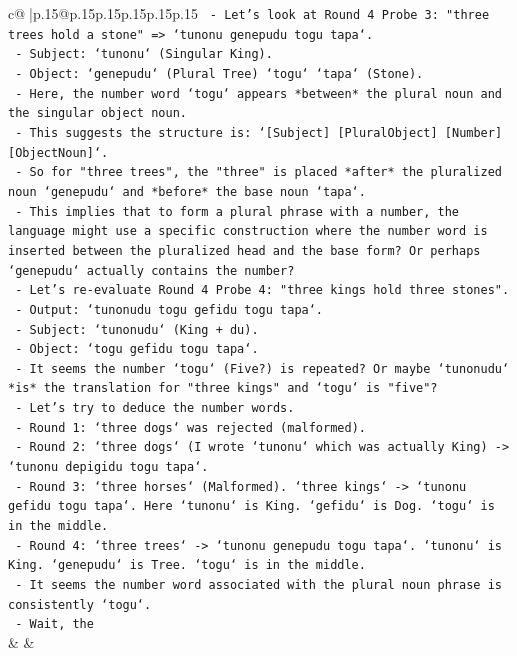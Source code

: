 \documentclass{article}
\begin{document}
{\begin{supertabular}{c@{$\;$}|p{.15\linewidth}@{}p{.15\linewidth}p{.15\linewidth}p{.15\linewidth}p{.15\linewidth}p{.15\linewidth}}
{{{\texttt{  {-} Let's look at Round 4 Probe 3: "three trees hold a stone" => `tunonu genepudu togu tapa`.} \\
\texttt{    {-} Subject: `tunonu` (Singular King).} \\
\texttt{    {-} Object: `genepudu` (Plural Tree) `togu` `tapa` (Stone).} \\
\texttt{    {-} Here, the number word `togu` appears *between* the plural noun and the singular object noun.} \\
\texttt{    {-} This suggests the structure is: `{[}Subject{]} {[}PluralObject{]} {[}Number{]} {[}ObjectNoun{]}`.} \\
\texttt{    {-} So for "three trees", the "three" is placed *after* the pluralized noun `genepudu` and *before* the base noun `tapa`.} \\
\texttt{    {-} This implies that to form a plural phrase with a number, the language might use a specific construction where the number word is inserted between the pluralized head and the base form? Or perhaps `genepudu` actually contains the number?} \\
\texttt{    {-} Let's re{-}evaluate Round 4 Probe 4: "three kings hold three stones".} \\
\texttt{      {-} Output: `tunonudu togu gefidu togu tapa`.} \\
\texttt{      {-} Subject: `tunonudu` (King + du).} \\
\texttt{      {-} Object: `togu gefidu togu tapa`.} \\
\texttt{      {-} It seems the number `togu` (Five?) is repeated? Or maybe `tunonudu` *is* the translation for "three kings" and `togu` is "five"?} \\
\texttt{      {-} Let's try to deduce the number words.} \\
\texttt{      {-} Round 1: `three dogs` was rejected (malformed).} \\
\texttt{      {-} Round 2: `three dogs` (I wrote `tunonu` which was actually King) {-}> `tunonu depigidu togu tapa`.} \\
\texttt{      {-} Round 3: `three horses` (Malformed). `three kings` {-}> `tunonu gefidu togu tapa`. Here `tunonu` is King. `gefidu` is Dog. `togu` is in the middle.} \\
\texttt{      {-} Round 4: `three trees` {-}> `tunonu genepudu togu tapa`. `tunonu` is King. `genepudu` is Tree. `togu` is in the middle.} \\
\texttt{      {-} It seems the number word associated with the plural noun phrase is consistently `togu`.} \\
\texttt{      {-} Wait, the} \\
            }
        }
    }
    & & \\ \\


\end{supertabular}}
\end{document}
